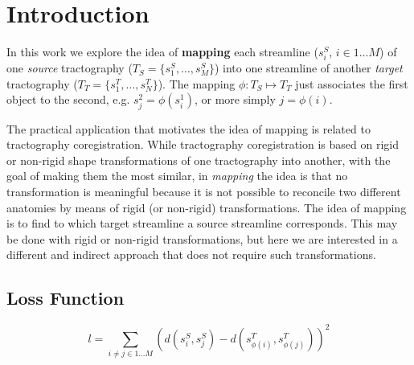 \section{Introduction}
\label{sec:introduction}

In this work we explore the idea of \textbf{mapping} each streamline
($s^S_i$, $i \in 1 \ldots M$) of one \emph{source} tractography ($T_S
= \{s^S_1,\ldots,s^S_M\}$) into one streamline of another
\emph{target} tractography ($T_T = \{s^T_1,\ldots,s^T_N\}$). The
mapping $\phi: T_S \mapsto T_T$ just associates the first object to
the second, e.g. $s^2_j = \phi(s^1_i)$, or more simply $j = \phi(i)$.

The practical application that motivates the idea of mapping is
related to tractography coregistration. While tractography
coregistration is based on rigid or non-rigid shape transformations of
one tractography into another, with the goal of making them the most
similar, in \emph{mapping} the idea is that no transformation is
meaningful because it is not possible to reconcile two different
anatomies by means of rigid (or non-rigid) transformations. The idea
of mapping is to find to which target streamline a source streamline
corresponds. This may be done with rigid or non-rigid transformations,
but here we are interested in a different and indirect approach that
does not require such transformations.

\subsection{Loss Function}
\begin{equation}
  \label{eq:loss}
  l = \sum_{i \neq j \in 1 \ldots M} (d(s^S_i, s^S_j) -
  d(s^T_{\phi(i)}, s^T_{\phi(j)}))^2
\end{equation}



